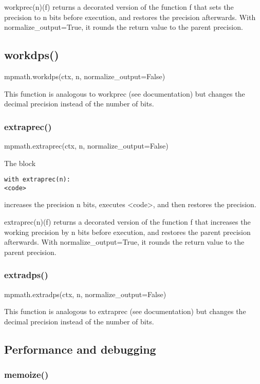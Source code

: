 \vpara
workprec(n)(f) returns a decorated version of the function f that sets the precision to n bits before execution, and restores the precision afterwards. With normalize\_output=True, it rounds the return value to the parent precision.

\subsection{workdps()}

mpmath.workdps(ctx, n, normalize\_output=False)

\vpara
This function is analogous to workprec (see documentation) but changes the decimal precision instead of the number of bits.


\subsubsection{extraprec()}

mpmath.extraprec(ctx, n, normalize\_output=False)

The block
\begin{lstlisting}
with extraprec(n):
<code>
\end{lstlisting}
increases the precision n bits, executes <code>, and then restores the precision.

\vpara
extraprec(n)(f) returns a decorated version of the function f that increases the working precision by n bits before execution, and restores the parent precision afterwards. With normalize\_output=True, it rounds the return value to the parent precision.

\subsubsection{extradps()}

mpmath.extradps(ctx, n, normalize\_output=False)

This function is analogous to extraprec (see documentation) but changes the decimal precision instead of the number of bits.

\subsection{Performance and debugging}

\subsubsection{memoize()}


